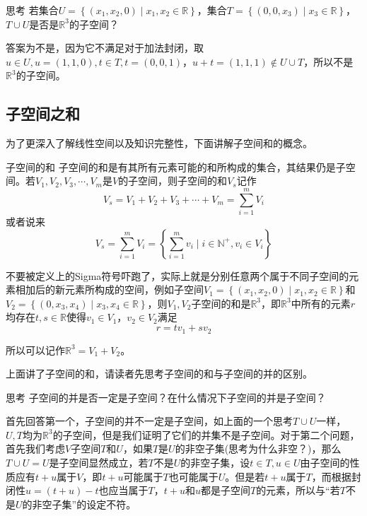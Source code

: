 \begin{ascolorbox1}{思考}
	若集合$U=\left\{ (x_1,x_2,0) \mid x_1,x_2 \in \mathbb{R} \right\}$，集合$T=\left\{ (0,0,x_3) \mid x_3 \in \mathbb{R} \right\}$，$T\cup U$是否是$\mathbb{R}^3$的子空间？
\end{ascolorbox1}

答案为不是，因为它不满足对于加法封闭，取$u\in U,u=(1,1,0),t \in T,t=(0,0,1)$，$u+t=(1,1,1) \notin U\cup T$，所以不是$\mathbb{R}^3$的子空间。

\subsection{子空间之和}

为了更深入了解线性空间以及知识完整性，下面讲解子空间和的概念。

\begin{definition}{子空间的和}
	子空间的和是有其所有元素可能的和所构成的集合，其结果仍是子空间。若$V_1,V_2,V_3,\cdots,V_m$是$V$的子空间，则子空间的和$V_s$记作$$V_s=V_1+V_2+V_3+\cdots+V_m=\sum_{i=1}^{m}V_i $$或者说来$$V_s=\sum_{i=1}^{m}V_i =\left\{ \sum_{i=1}^{m}v_i \mid i\in \mathbb{N}^+,v_i \in V_i \right\}$$
\end{definition}

不要被定义上的Sigma符号吓跑了，实际上就是分别任意两个属于不同子空间的元素相加后的新元素所构成的空间，例如子空间$V_1=\left\{ (x_1,x_2,0)\mid x_1,x_2\in \mathbb{R} \right\}$和$V_2=\left\{ (0,x_3,x_4)\mid x_3,x_4\in \mathbb{R} \right\}$，则$V_1,V_2$子空间的和是$\mathbb{R}^3$，即$\mathbb{R}^3$中所有的元素$r$均存在$t,s\in \mathbb{R}$使得$v_1\in V_1$，$v_2\in V_2$满足$$r=tv_1+sv_2$$

所以可以记作$\mathbb{R}^3=V_1+V_2$。

上面讲了子空间的和，请读者先思考子空间的和与子空间的并的区别。

\begin{ascolorbox1}{思考}
	子空间的并是否一定是子空间？在什么情况下子空间的并是子空间？
\end{ascolorbox1}

首先回答第一个，子空间的并不一定是子空间，如上面的一个思考$T\cup U$一样，$U,T$均为$\mathbb{R}^3$的子空间，但是我们证明了它们的并集不是子空间。对于第二个问题，首先我们考虑$V$子空间$T$和$U$，如果$T$是$U$的非空子集(思考为什么非空？)，那么$T \cup U=U$是子空间显然成立，若$T$不是$U$的非空子集，设$t\in T,u\in U$由子空间的性质应有$t+u$属于$V$，即$t+u$可能属于$T$也可能属于$U$。但是若$t+u$属于$T$，而根据封闭性$u=(t+u)-t$也应当属于$T$，$t+u$和$u$都是子空间$T$的元素，所以与``若$T$不是$U$的非空子集''的设定不符。

